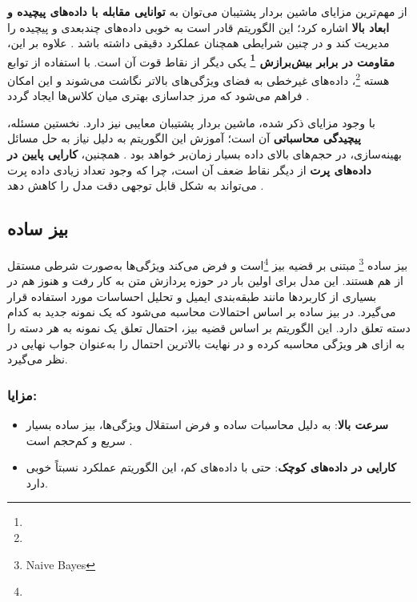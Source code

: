 از مهم‌ترین مزایای ماشین بردار پشتیبان می‌توان به \textbf{توانایی مقابله با داده‌های پیچیده و ابعاد بالا} اشاره کرد؛ این الگوریتم قادر است به خوبی داده‌های چندبعدی و پیچیده را مدیریت کند و در چنین شرایطی همچنان عملکرد دقیقی داشته باشد \cite{vapnik1998statistical}. علاوه بر این، \textbf{مقاومت در برابر بیش‌برازش \footnote{}} یکی دیگر از نقاط قوت آن است. با استفاده از توابع هسته \footnote{}، داده‌های غیرخطی به فضای ویژگی‌های بالاتر نگاشت می‌شوند و این امکان فراهم می‌شود که مرز جداسازی بهتری میان کلاس‌ها ایجاد گردد \cite{cortes1995support}. 

با وجود مزایای ذکر شده، ماشین بردار پشتیبان معایبی نیز دارد. نخستین مسئله، \textbf{پیچیدگی محاسباتی} آن است؛ آموزش این الگوریتم به دلیل نیاز به حل مسائل بهینه‌سازی، در حجم‌های بالای داده بسیار زمان‌بر خواهد بود \cite{murphy2012machine}. همچنین، \textbf{کارایی پایین در داده‌های پرت} از دیگر نقاط ضعف آن است، چرا که وجود تعداد زیادی داده پرت می‌تواند به شکل قابل توجهی دقت مدل را کاهش دهد \cite{bishop2006pattern}.



\subsection{بیز ساده}
بیز ساده \footnote{Naive Bayes} مبتنی بر قضیه بیز \footnote{}است و فرض می‌کند ویژگی‌ها به‌صورت شرطی مستقل از هم هستند\cite{domingos1997optimal,mitchell1997machine}.
این مدل برای اولین بار در حوزه پردازش متن به کار رفت و هنوز هم در بسیاری از کاربردها مانند طبقه‌بندی ایمیل و تحلیل احساسات مورد استفاده قرار می‌گیرد\cite{mccallum1998comparison}. 
در بیز ساده بر اساس احتمالات محاسبه می‌شود که یک نمونه جدید به کدام دسته تعلق دارد. این الگوریتم بر اساس قضیه بیز، احتمال تعلق یک نمونه به هر دسته را به ازای هر ویژگی محاسبه کرده و در نهایت بالاترین احتمال را به‌عنوان جواب نهایی در نظر می‌گیرد\cite{bishop2006pattern}.

\subsubsection{مزایا:}
\begin{itemize}
	\item \textbf{سرعت بالا}: به دلیل محاسبات ساده و فرض استقلال ویژگی‌ها، بیز ساده بسیار سریع و کم‌حجم است
	\cite{mccallum1998comparison}.
	\item \textbf{کارایی در داده‌های کوچک}: حتی با داده‌های کم، این الگوریتم عملکرد نسبتاً خوبی دارد\cite{murphy2012machine}.
\end{itemize} 	

